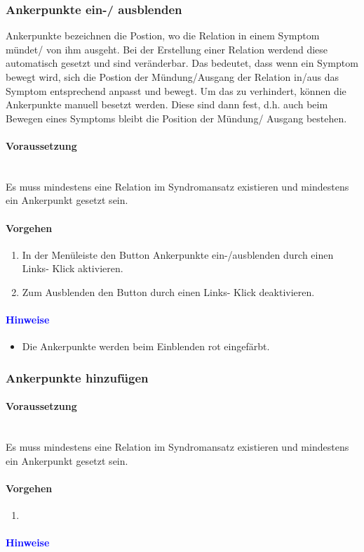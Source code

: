 \documentclass[enabledeprecatedfontcommands,fontsize=11pt,paper=a4,twoside]{scrartcl}
\newcommand*{\hint}{\paragraph{\textcolor{blue}{Hinweise}}}
\newcommand*{\condition}{\paragraph{Voraussetzung}$\;$ \vspace{0.2cm}\\}
\newcommand*{\action}{\paragraph{Vorgehen}}
\begin{document}
		\subsubsection{Ankerpunkte ein-/ ausblenden}
		Ankerpunkte bezeichnen die Postion, wo die Relation in einem Symptom mündet/ von ihm ausgeht. Bei der Erstellung einer Relation werdend diese automatisch gesetzt und sind veränderbar. Das bedeutet, dass wenn ein Symptom bewegt wird, sich die Postion der Mündung/Ausgang der Relation in/aus das Symptom entsprechend anpasst und bewegt. Um das zu verhindert, können die Ankerpunkte manuell besetzt werden. Diese sind dann fest, d.h. auch beim Bewegen eines Symptoms bleibt die Position der Mündung/ Ausgang bestehen.
		\condition
			Es muss mindestens eine Relation im Syndromansatz existieren und mindestens ein Ankerpunkt gesetzt sein. 
		\action
			\begin{enumerate}
				\item In der Menüleiste den Button Ankerpunkte ein-/ausblenden durch einen Links- Klick aktivieren.
				\item Zum Ausblenden den Button durch einen Links- Klick deaktivieren. 
			\end{enumerate}
		\hint
		\begin{itemize}
			\item Die Ankerpunkte werden beim Einblenden rot eingefärbt. 
		\end{itemize}
		\begin{figure}[ht!]
			\centering
		\end{figure}
		
		\newpage
		\subsubsection{Ankerpunkte hinzufügen}
		\condition
			Es muss mindestens eine Relation im Syndromansatz existieren und mindestens ein Ankerpunkt gesetzt sein. 
		\action
			\begin{enumerate}
				\item 
			\end{enumerate}
		\hint
		
\end{document}
